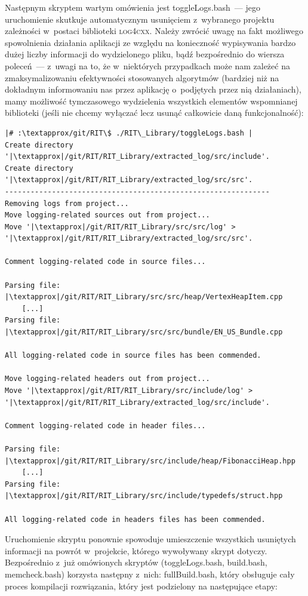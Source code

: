 Następnym skryptem wartym omówienia jest \textsf{toggleLogs.bash}~--- jego uruchomienie skutkuje automatycznym usunięciem z~wybranego projektu zależności w~postaci biblioteki \textsc{log4cxx}.
Należy zwrócić uwagę na fakt możliwego spowolnienia działania aplikacji ze względu na konieczność wypisywania bardzo dużej liczby informacji do wydzielonego pliku, bądź bezpośrednio do wiersza poleceń~--- z~uwagi na to, że w~niektórych przypadkach może nam zależeć na zmaksymalizowaniu efektywności stosowanych algorytmów (bardziej niż na dokładnym informowaniu nas przez aplikację o~podjętych przez nią działaniach), mamy możliwość tymczasowego wydzielenia wszystkich elementów wspomnianej biblioteki (jeśli nie chcemy wyłączać lecz usunąć całkowicie daną funkcjonalność):

\begin{verbatim}
|# :\textapprox/git/RIT\$ ./RIT\_Library/toggleLogs.bash |
Create directory '|\textapprox|/git/RIT/RIT_Library/extracted_log/src/include'.
Create directory '|\textapprox|/git/RIT/RIT_Library/extracted_log/src/src'.
--------------------------------------------------------------
Removing logs from project...
Move logging-related sources out from project...
Move '|\textapprox|/git/RIT/RIT_Library/src/src/log' > '|\textapprox|/git/RIT/RIT_Library/extracted_log/src/src'.

Comment logging-related code in source files...

Parsing file: |\textapprox|/git/RIT/RIT_Library/src/src/heap/VertexHeapItem.cpp
	[...]
Parsing file: |\textapprox|/git/RIT/RIT_Library/src/src/bundle/EN_US_Bundle.cpp

All logging-related code in source files has been commended.

Move logging-related headers out from project...
Move '|\textapprox|/git/RIT/RIT_Library/src/include/log' > '|\textapprox|/git/RIT/RIT_Library/extracted_log/src/include'.

Comment logging-related code in header files...

Parsing file: |\textapprox|/git/RIT/RIT_Library/src/include/heap/FibonacciHeap.hpp
	[...]
Parsing file: |\textapprox|/git/RIT/RIT_Library/src/include/typedefs/struct.hpp

All logging-related code in headers files has been commended.
\end{verbatim}

Uruchomienie skryptu ponownie spowoduje umieszczenie wszystkich usuniętych informacji na powrót w~projekcie, którego wywoływany skrypt dotyczy.
Bezpośrednio z~już omówionych skryptów (\textsf{toggleLogs.bash}, \textsf{build.bash}, \textsf{memcheck.bash}) korzysta następny z~nich: \textsf{fullBuild.bash}, który obsługuje cały proces kompilacji rozwiązania, który jest podzielony na następujące etapy:

